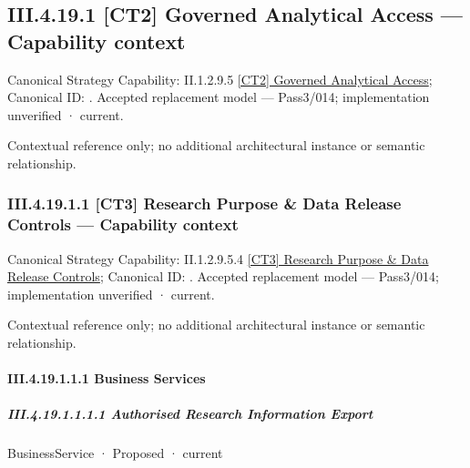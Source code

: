 \subsection*{III.4.19.1 [CT2] Governed Analytical Access — Capability context}
\label{navigation:III.4.19.1}

{\small Canonical Strategy Capability: II.1.2.9.5 \hyperref[element:262a67d8e3fc4a4abfc5a014af89479c]{[CT2] Governed Analytical Access}; Canonical ID: \texttt{}. Accepted replacement model — Pass3/014; implementation unverified · current.}\par
Contextual reference only; no additional architectural instance or semantic relationship.\par
\subsubsection*{III.4.19.1.1 [CT3] Research Purpose \& Data Release Controls — Capability context}
\label{navigation:III.4.19.1.1}

{\small Canonical Strategy Capability: II.1.2.9.5.4 \hyperref[element:6ca69337ffe1477292944524be0693c9]{[CT3] Research Purpose \& Data Release Controls}; Canonical ID: \texttt{}. Accepted replacement model — Pass3/014; implementation unverified · current.}\par
Contextual reference only; no additional architectural instance or semantic relationship.\par
\paragraph*{III.4.19.1.1.1 Business Services}
\label{navigation:III.4.19.1.1.1}

\subparagraph*{III.4.19.1.1.1.1 Authorised Research Information Export}
\label{navigation:III.4.19.1.1.1.1}

\label{element:134e1ff0331040b3a8069c9dc5e331d4}
{\small BusinessService · Proposed · current}\par

